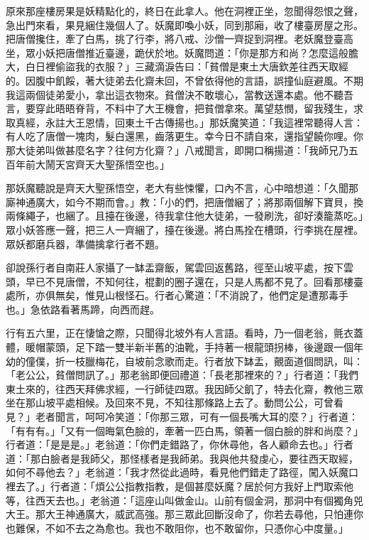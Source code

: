 原來那座樓房果是妖精點化的，終日在此拿人。他在洞裡正坐，忽聞得怨恨之聲，急出門來看，果見綑住幾個人了。妖魔即喚小妖，同到那廂，收了樓臺房屋之形。把唐僧攙住，牽了白馬，挑了行李，將八戒、沙僧一齊捉到洞裡。老妖魔登臺高坐，眾小妖把唐僧推近臺邊，跪伏於地。妖魔問道：「你是那方和尚？怎麼這般膽大，白日裡偷盜我的衣服？」三藏滴淚告曰：「貧僧是東土大唐欽差往西天取經的。因腹中飢餒，著大徒弟去化齋未回，不曾依得他的言語，誤撞仙庭避風。不期我這兩個徒弟愛小，拿出這衣物來。貧僧決不敢壞心，當教送還本處。他不聽吾言，要穿此晤晤脊背，不料中了大王機會，把貧僧拿來。萬望慈憫，留我殘生，求取真經，永註大王恩情，回東土千古傳揚也。」那妖魔笑道：「我這裡常聽得人言：有人吃了唐僧一塊肉，髮白還黑，齒落更生。幸今日不請自來，還指望饒你哩。你那大徒弟叫做甚麼名字？往何方化齋？」八戒聞言，即開口稱揚道：「我師兄乃五百年前大鬧天宮齊天大聖孫悟空也。」

那妖魔聽說是齊天大聖孫悟空，老大有些悚懼，口內不言，心中暗想道：「久聞那廝神通廣大，如今不期而會。」教：「小的們，把唐僧綑了；將那兩個解下寶貝，換兩條繩子，也綑了。且擡在後邊，待我拿住他大徒弟，一發刷洗，卻好湊籠蒸吃。」眾小妖答應一聲，把三人一齊綑了，擡在後邊。將白馬拴在槽頭，行李挑在屋裡。眾妖都磨兵器，準備擒拿行者不題。

卻說孫行者自南莊人家攝了一缽盂齋飯，駕雲回返舊路，徑至山坡平處，按下雲頭，早已不見唐僧，不知何往，棍劃的圈子還在，只是人馬都不見了。回看那樓臺處所，亦俱無矣，惟見山根怪石。行者心驚道：「不消說了，他們定是遭那毒手也。」急依路看著馬蹄，向西而趕。

行有五六里，正在悽愴之際，只聞得北坡外有人言語。看時，乃一個老翁，氈衣蓋體，暖帽蒙頭，足下踏一雙半新半舊的油靴，手持著一根龍頭拐棒，後邊跟一個年幼的僮僕，折一枝臘梅花，自坡前念歌而走。行者放下缽盂，覿面道個問訊，叫：「老公公，貧僧問訊了。」那老翁即便回禮道：「長老那裡來的？」行者道：「我們東土來的，往西天拜佛求經，一行師徒四眾。我因師父飢了，特去化齋，教他三眾坐在那山坡平處相候。及回來不見，不知往那條路上去了。動問公公，可曾看見？」老者聞言，呵呵冷笑道：「你那三眾，可有一個長嘴大耳的麼？」行者道：「有有有。」「又有一個晦氣色臉的，牽著一匹白馬，領著一個白臉的胖和尚麼？」行者道：「是是是。」老翁道：「你們走錯路了，你休尋他，各人顧命去也。」行者道：「那白臉者是我師父，那怪樣者是我師弟。我與他共發虔心，要往西天取經，如何不尋他去？」老翁道：「我才然從此過時，看見他們錯走了路徑，闖入妖魔口裡去了。」行者道：「煩公公指教指教，是個甚麼妖魔？居於何方我好上門取索他等，往西天去也。」老翁道：「這座山叫做金山。山前有個金洞，那洞中有個獨角兕大王。那大王神通廣大，威武高強。那三眾此回斷沒命了，你若去尋他，只怕連你也難保，不如不去之為愈也。我也不敢阻你，也不敢留你，只憑你心中度量。」

